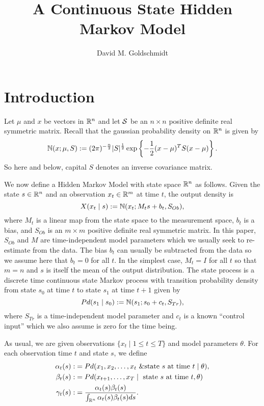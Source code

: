 \documentclass[12pt,leqno]{article}
\title{A Continuous State Hidden Markov Model}
\author{David M. Goldschmidt}
\begin{document}
\newcommand{\p}{\ensuremath{u}}
\newcommand{\VV}{V}
\maketitle


\section{Introduction}
Let $\mu$ and $x$ be vectors in $\R^n$ and let $\S$ be an $n\times{n}$ positive
definite real symmetric matrix.  Recall that the gaussian probability density
on $\R^n$ is given by 
$$
\N(x;\mu,S) := (2\pi)^{-\frac{n}{2}}|S|^{\frac{1}{2}}\exp\left\{-\frac{1}{2}
(x - \mu)^TS(x-\mu)\right\}.
$$
So here and below, capital $S$ denotes an inverse covariance matrix.

We now define a Hidden Markov Model with state space $\R^n$ as follows.  Given the state $s\in\R^n$ and an observation $x_t\in\R^m$ at time $t$, the output density is
$$
X(x_t\mid s) := \N(x_t;M_ts + b_t,S_{Ob}),
$$
where $M_t$ is a linear map from the state space to the
measurement space, $b_t$ is a bias, and $S_{Ob}$ is an $m\times{m}$ positive definite real symmetric matrix.  In this paper, $S_{Ob}$ and 
$M$ are time-independent model parameters which we usually seek to re-estimate from the data.  The bias $b_t$ can usually be 
subtracted from the data so we assume here that $b_t = 0$ for all $t$. 
In the simplest case, $M_t = I$ for all $t$ so that $m = n$ and $s$ is itself the mean of the output distribution.  
The state process is a discrete time continuous state Markov process with transition probability density
from state $s_0$ at time $t$ to state $s_1$ at time $t+1$ given by
$$
Pd(s_1\mid s_0) :=  \N(s_1;s_0+c_t,S_{Tr}),
$$
where $S_{Tr}$ is a time-independent model parameter 
and $c_t$ is a known ``control input'' which we also assume is zero for the time being.

As usual, we are given observations $\{x_t\mid 1\le t\le T\}$ and model parameters $\theta$.  For each observation time $t$ and state $s$, we define
\begin{align*}
  \alpha_t(s) :&= Pd(x_1,x_2,\dots,x_t~ \& \text{state $s$ at time $t$}\mid \theta ),\\
  \beta_t(s) :&= Pd(x_{t+1},\dots,x_T \mid ~\text{state $s$ at time $t$},\theta)\\
  \gamma_t(s) :&= \frac{\alpha_t(s)\beta_t(s)}{\int_{\R^n}\alpha_t(s)\beta_t(s)ds}.
\end{align*}
\end{document}
